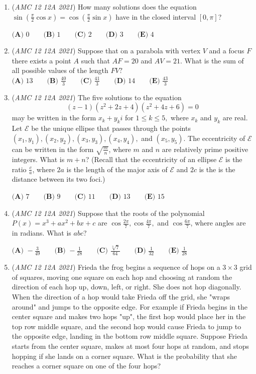 \begin{enumerate}
 $\textbf{(A) }\frac{17}{32} \qquad \textbf{(B) }\frac{11}{16} \qquad \textbf{(C) }\frac79 \qquad \textbf{(D) }\frac76\qquad \textbf{(E) }\frac{25}{11}$


	\item (\textit{AMC 12 12A 2021}) How many solutions does the equation $\sin \left( \frac{\pi}2 \cos x\right)=\cos \left( \frac{\pi}2 \sin x\right)$ have in the closed interval $[0,\pi]$?


 $\textbf{(A) }0 \qquad \textbf{(B) }1 \qquad \textbf{(C) }2 \qquad \textbf{(D) }3\qquad \textbf{(E) }4$


	\item (\textit{AMC 12 12A 2021}) Suppose that on a parabola with vertex $V$ and a focus $F$ there exists a point $A$ such that $AF=20$ and $AV=21$. What is the sum of all possible values of the length $FV?$
$\textbf{(A) }13 \qquad \textbf{(B) }\frac{40}3 \qquad \textbf{(C) }\frac{41}3 \qquad \textbf{(D) }14\qquad \textbf{(E) }\frac{43}3$


	\item (\textit{AMC 12 12A 2021}) The five solutions to the equation
 \[(z-1)(z^2+2z+4)(z^2+4z+6)=0\] may be written in the form $x_k+y_ki$ for $1\le k\le 5,$ where $x_k$ and $y_k$ are real. Let $\mathcal E$ be the unique ellipse that passes through the points $(x_1,y_1),(x_2,y_2),(x_3,y_3),(x_4,y_4),$ and $(x_5,y_5)$. The eccentricity of $\mathcal E$ can be written in the form $\sqrt{\frac mn}$, where $m$ and $n$ are relatively prime positive integers. What is $m+n$? (Recall that the eccentricity of an ellipse $\mathcal E$ is the ratio $\frac ca$, where $2a$ is the length of the major axis of $\mathcal E$ and $2c$ is the is the distance between its two foci.)


 $\textbf{(A) }7 \qquad \textbf{(B) }9 \qquad \textbf{(C) }11 \qquad \textbf{(D) }13\qquad \textbf{(E) }15$


	\item (\textit{AMC 12 12A 2021}) Suppose that the roots of the polynomial $P(x)=x^3+ax^2+bx+c$ are $\cos \frac{2\pi}7,\cos \frac{4\pi}7,$ and $\cos \frac{6\pi}7$, where angles are in radians. What is $abc$?


 $\textbf{(A) }{-}\frac{3}{49} \qquad \textbf{(B) }{-}\frac{1}{28} \qquad \textbf{(C) }\frac{\sqrt[3]7}{64} \qquad \textbf{(D) }\frac{1}{32}\qquad \textbf{(E) }\frac{1}{28}$


	\item (\textit{AMC 12 12A 2021}) Frieda the frog begins a sequence of hops on a $3\times3$ grid of squares, moving one square on each hop and choosing at random the direction of each hop up, down, left, or right. She does not hop diagonally. When the direction of a hop would take Frieda off the grid, she "wraps around" and jumps to the opposite edge. For example if Frieda begins in the center square and makes two hops "up", the first hop would place her in the top row middle square, and the second hop would cause Frieda to jump to the opposite edge, landing in the bottom row middle square. Suppose Frieda starts from the center square, makes at most four hops at random, and stops hopping if she lands on a corner square. What is the probability that she reaches a corner square on one of the four hops?



\end{enumerate}
